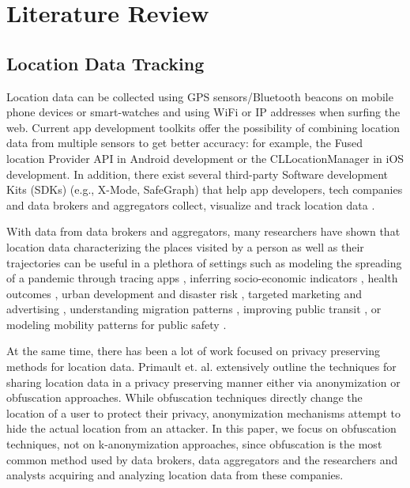 \section{Literature Review}
\subsection{Location Data Tracking}
Location data can be collected using GPS sensors/Bluetooth beacons on mobile phone devices or smart-watches and using WiFi or IP addresses when surfing the web. Current app development toolkits offer the possibility of combining location data from multiple sensors to get better accuracy: for example, the Fused location Provider API \cite{googleFusedLocation} in Android development or the CLLocationManager \cite{appleCCLocation} in iOS development. 
In addition, there exist several third-party Software development Kits (SDKs) (e.g., X-Mode, SafeGraph) that help app developers, tech companies and data brokers and aggregators collect, visualize and track location data \cite{vox_privacy}.  

With data from data brokers and aggregators, 
many researchers have shown that location data characterizing the places visited by a person as well as their trajectories can be useful in a plethora of settings such as modeling the spreading of a pandemic through tracing apps \cite{contact_tracing_apps}, 
inferring socio-economic indicators \cite{hong2016topic,estabaan_urban_dynamics}, health outcomes \cite{garcia_you_are_what_you_eat}, urban development and disaster risk \cite{equalizer_social_infra,hurricane_trd}, 
targeted marketing and advertising \cite{location_advertising},
understanding migration patterns \cite{hong2019characterization},
improving public transit \cite{ma2014development}, 
or modeling mobility patterns for public safety \cite{wu2022enhancing}.

At the same time, there has been a lot of work focused on privacy preserving methods for location data. 
Primault et. al. \cite{longroadcomp} extensively outline the techniques for sharing location data in a privacy preserving manner either via anonymization or obfuscation approaches. While
obfuscation techniques directly change the location of a user to protect their privacy, anonymization mechanisms attempt to hide the actual location from an attacker. 
In this paper, we focus on obfuscation techniques, not on k-anonymization approaches, since obfuscation is the most common method used by data brokers, data aggregators and the researchers and analysts acquiring and analyzing location data from these companies.  


